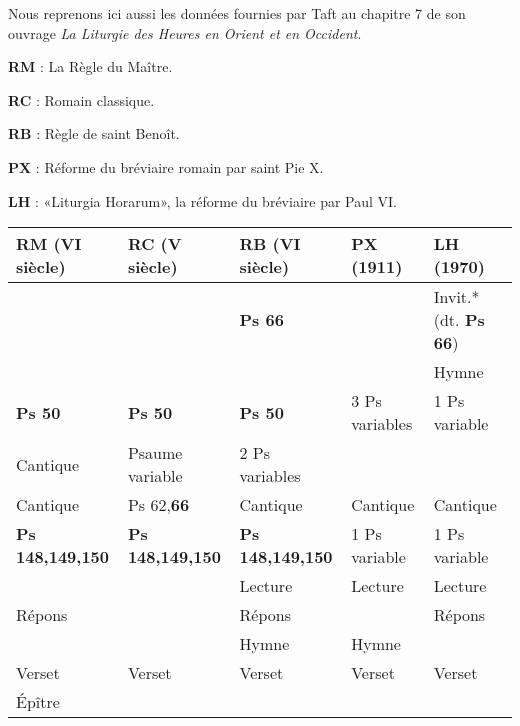\documentclass[oneside, 10pt]{article}
\begin{document}

Nous reprenons ici aussi les données fournies par Taft au chapitre 7 de son ouvrage \emph{La Liturgie des Heures en Orient et en Occident}.

\textbf{RM} : La Règle du Maître.

\textbf{RC} : Romain classique.

\textbf{RB} : Règle de saint Benoît.

\textbf{PX} : Réforme du bréviaire romain par saint Pie X.

\textbf{LH} : «Liturgia Horarum», la réforme du bréviaire par Paul VI.

\begin{center}
\begin{tabular}{ | l | l | l | l | l | }
\hline
RM (VI\up{ème} siècle)  & RC (V\up{ème} siècle)   & RB (VI\up{ème} siècle)  & PX (1911)              & LH (1970) \\
\hline
                        &                         & \textbf{Ps 66}          &                        & Invit.* (dt. \textbf{Ps 66})\\
                        &                         &                         &                        & Hymne\\
\textbf{Ps 50}          & \textbf{Ps 50}          & \textbf{Ps 50}          & 3 Ps variables         & 1 Ps variable \\
Cantique                & Psaume variable         & 2 Ps variables          &                        & \\
Cantique                & Ps 62,\textbf{66}       & Cantique                & Cantique               & Cantique\\
\textbf{Ps 148,149,150} & \textbf{Ps 148,149,150} & \textbf{Ps 148,149,150} & 1 Ps variable          & 1 Ps variable\\
                        &                         & Lecture                 & Lecture                & Lecture \\
Répons                  &                         & Répons                  &                        & Répons \\
                        &                         & Hymne                   & Hymne           		 &         \\
Verset                  & Verset                  & Verset                  & Verset                 & Verset \\
Épître                  &                         &                         &                        &        \\

\end{tabular}
\end{center}
\end{document}
